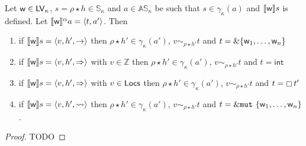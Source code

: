 \begin{proposition}
  \label{prop:abstract_leftvalues_correctness}
  Let $\mathsf{w}\in\Leftvalues_\kappa$, $s=\rho\star h\in\mathbb{S}_\kappa$
  and $a\in\mathbb{AS}_\kappa$ be
  such that $s\in\gamma_\kappa(a)$ and
  $\den[\mathsf{w}]{s}$ is defined. Let
  $\dena[\mathsf{w}]{a}=\langle t,a'\rangle$. Then
  \begin{enumerate}
  \item if $\den[\mathsf{w}]{s}=\langle v,h',\to\rangle$
    then $\rho\star h'\in\gamma_\kappa(a')$, $v\sim_{\rho\star h'}t$
    and $t=\borrow\{\mathsf{w}_1,\ldots,\mathsf{w}_n\}$
  \item if $\den[\mathsf{w}]{s}=\langle v,h',\Rightarrow\rangle$ with $v\in\mathbb{Z}$
    then $\rho\star h'\in\gamma_\kappa(a')$, $v\sim_{\rho\star h'}t$
    and $t=\mathsf{int}$
  \item if $\den[\mathsf{w}]{s}=\langle v,h',\Rightarrow\rangle$ with $v\in\Locs$
    then $\rho\star h'\in\gamma_\kappa(a')$, $v\sim_{\rho\star h'}t$
    and $t=\boxtype{t'}$
  \item if $\den[\mathsf{w}]{s}=\langle v,h',\leadsto\rangle$
    then $\rho\star h'\in\gamma_\kappa(a')$, $v\sim_{\rho\star h'}t$
    and $t=\mutborrow\{\mathsf{w}_1,\ldots,\mathsf{w}_n\}$.
  \end{enumerate}
\end{proposition}
\begin{proof}
  TODO
\end{proof}
